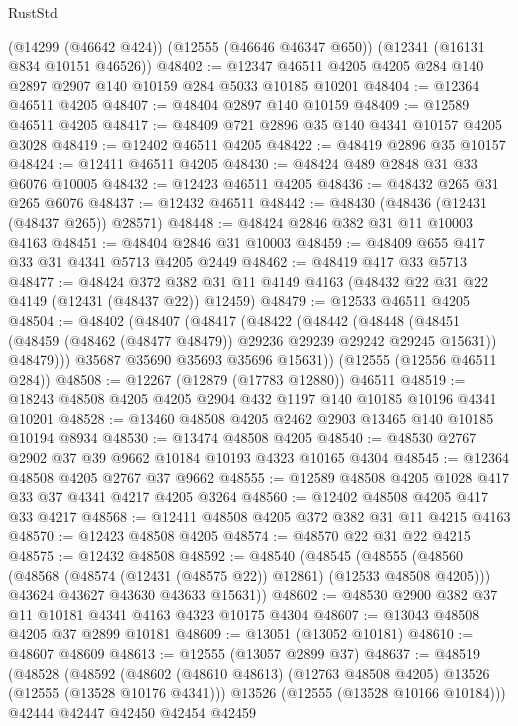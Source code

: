 \begin{lexlean}{RustStd}
\begin{coremodule}
    (@14299 (@46642 @424))
    (@12555 (@46646 @46347 @650))
    (@12341 (@16131 @834 @10151 @46526))
@48402 := @12347 @46511 @4205 @4205 @284 @140 @2897 @2907 @140 @10159 @284 @5033 @10185 @10201
@48404 := @12364 @46511 @4205
@48407 := @48404 @2897 @140 @10159
@48409 := @12589 @46511 @4205
@48417 := @48409 @721 @2896 @35 @140 @4341 @10157 @4205 @3028
@48419 := @12402 @46511 @4205
@48422 := @48419 @2896 @35 @10157
@48424 := @12411 @46511 @4205
@48430 := @48424 @489 @2848 @31 @33 @6076 @10005
@48432 := @12423 @46511 @4205
@48436 := @48432 @265 @31 @265 @6076
@48437 := @12432 @46511
@48442 := @48430 (@48436 (@12431 (@48437 @265)) @28571)
@48448 := @48424 @2846 @382 @31 @11 @10003 @4163
@48451 := @48404 @2846 @31 @10003
@48459 := @48409 @655 @417 @33 @31 @4341 @5713 @4205 @2449
@48462 := @48419 @417 @33 @5713
@48477 := @48424
    @372
    @382
    @31
    @11
    @4149
    @4163
    (@48432 @22 @31 @22 @4149 (@12431 (@48437 @22)) @12459)
@48479 := @12533 @46511 @4205
@48504 := @48402
    (@48407
      (@48417
        (@48422
          (@48442
            (@48448
              (@48451 (@48459 (@48462 (@48477 @48479)) @29236 @29239 @29242 @29245 @15631))
              @48479)))
        @35687
        @35690
        @35693
        @35696
        @15631))
    (@12555 (@12556 @46511 @284))
@48508 := @12267 (@12879 (@17783 @12880)) @46511
@48519 := @18243 @48508 @4205 @4205 @2904 @432 @1197 @140 @10185 @10196 @4341 @10201
@48528 := @13460 @48508 @4205 @2462 @2903 @13465 @140 @10185 @10194 @8934
@48530 := @13474 @48508 @4205
@48540 := @48530 @2767 @2902 @37 @39 @9662 @10184 @10193 @4323 @10165 @4304
@48545 := @12364 @48508 @4205 @2767 @37 @9662
@48555 := @12589 @48508 @4205 @1028 @417 @33 @37 @4341 @4217 @4205 @3264
@48560 := @12402 @48508 @4205 @417 @33 @4217
@48568 := @12411 @48508 @4205 @372 @382 @31 @11 @4215 @4163
@48570 := @12423 @48508 @4205
@48574 := @48570 @22 @31 @22 @4215
@48575 := @12432 @48508
@48592 := @48540
    (@48545
      (@48555
        (@48560 (@48568 (@48574 (@12431 (@48575 @22)) @12861) (@12533 @48508 @4205)))
        @43624
        @43627
        @43630
        @43633
        @15631))
@48602 := @48530 @2900 @382 @37 @11 @10181 @4341 @4163 @4323 @10175 @4304
@48607 := @13043 @48508 @4205 @37 @2899 @10181
@48609 := @13051 (@13052 @10181)
@48610 := @48607 @48609
@48613 := @12555 (@13057 @2899 @37)
@48637 := @48519
    (@48528
      (@48592
        (@48602 (@48610 @48613) (@12763 @48508 @4205) @13526 (@12555 (@13528 @10176 @4341)))
        @13526
        (@12555 (@13528 @10166 @10184)))
      @42444
      @42447
      @42450
      @42454
      @42459

\end{coremodule}
\end{lexlean}
